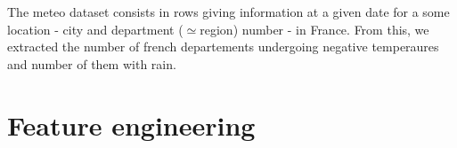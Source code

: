 \documentclass[english]{article}
\begin{document}
The meteo dataset consists in rows giving information at a given date
for a some location - city and department ($\simeq$region) number
- in France. From this, we extracted the number of french departements
undergoing negative temperaures and number of them with rain.


\section{Feature engineering}
\end{document}
